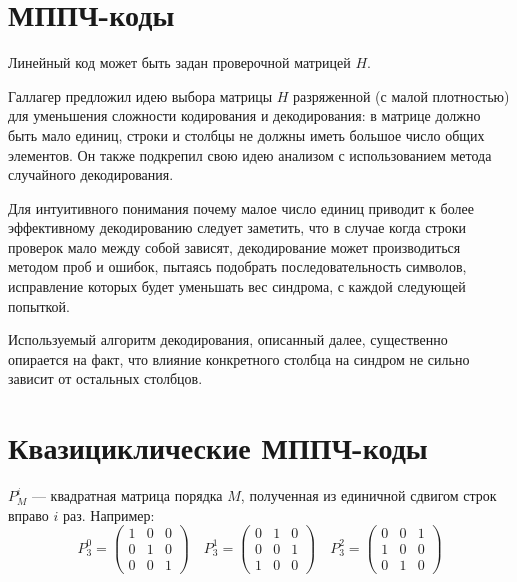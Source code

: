 \section{МППЧ-коды}

Линейный код может быть задан проверочной матрицей $H$.

Галлагер \cite{gallager} предложил идею выбора матрицы $H$ разряженной (с малой плотностью) для уменьшения
 сложности кодирования и декодирования: в матрице должно быть мало единиц, строки и столбцы не должны 
 иметь большое число  общих элементов. Он также подкрепил свою идею анализом с использованием 
 метода случайного декодирования.
 
 Для интуитивного понимания почему малое число единиц приводит к более эффективному декодированию следует
 заметить, что в случае когда строки проверок мало между собой зависят, декодирование может производиться 
 методом проб и ошибок, пытаясь подобрать последовательность символов, исправление которых будет уменьшать
 вес синдрома, с каждой следующей попыткой.
 
 Используемый алгоритм декодирования, описанный далее, существенно опирается на факт, что влияние конкретного
 столбца на синдром не сильно зависит от остальных столбцов.
 



\section{Квазициклические МППЧ-коды}

$P^i_M$ --- квадратная матрица порядка $M$, полученная из единичной сдвигом строк вправо $i$ раз. Например:
\[
P^0_3=
\begin{pmatrix}
	1 & 0 & 0 \\
	0 & 1 & 0 \\
	0 & 0 & 1
\end{pmatrix}
\quad
P^1_3=
\begin{pmatrix}
	0 & 1 & 0 \\
	0 & 0 & 1 \\
	1 & 0 & 0
\end{pmatrix}
\quad
P^2_3=
\begin{pmatrix}
	0 & 0 & 1 \\
	1 & 0 & 0 \\
	0 & 1 & 0
\end{pmatrix}
\] 

